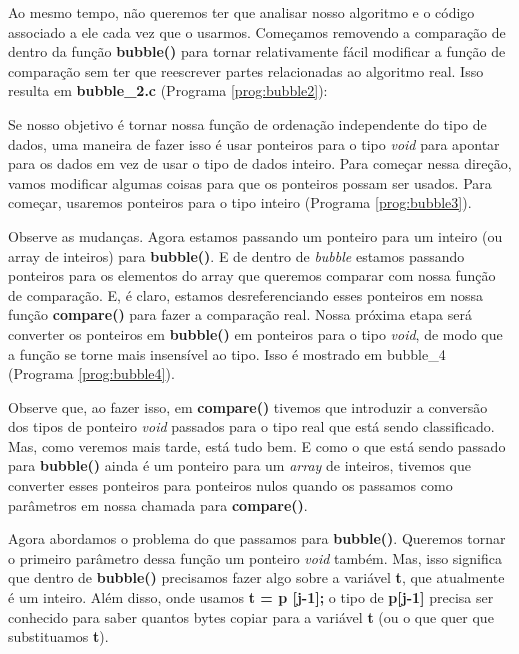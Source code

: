 Ao mesmo tempo, não queremos ter que analisar nosso algoritmo e o código associado a ele cada vez que o usarmos. Começamos removendo a comparação de dentro da função \textbf{bubble()} para tornar relativamente fácil modificar a função de comparação sem ter que reescrever partes relacionadas ao algoritmo real. Isso resulta em\textbf{ bubble\_2.c} (Programa \ref{prog:bubble2}):


Se nosso objetivo é tornar nossa função de ordenação independente do tipo de dados, uma maneira de fazer isso é usar ponteiros para o tipo \textit{void} para apontar para os dados em vez de usar o tipo de dados inteiro. Para começar nessa direção, vamos modificar algumas coisas para que os ponteiros possam ser usados. Para começar, usaremos ponteiros para o tipo inteiro (Programa \ref{prog:bubble3}).



Observe as mudanças. Agora estamos passando um ponteiro para um inteiro (ou array de inteiros) para \textbf{bubble()}. E de dentro de \textit{bubble} estamos passando ponteiros para os elementos do array que queremos comparar com nossa função de comparação. E, é claro, estamos desreferenciando esses ponteiros em nossa função \textbf{compare()} para fazer a comparação real. Nossa próxima etapa será converter os ponteiros em \textbf{bubble()} em ponteiros para o tipo \textit{void}, de modo que a função se torne mais insensível ao tipo. Isso é mostrado em bubble\_4 (Programa \ref{prog:bubble4}).



Observe que, ao fazer isso, em \textbf{compare()} tivemos que introduzir a conversão dos tipos de ponteiro \textit{void} passados para o tipo real que está sendo classificado. Mas, como veremos mais tarde, está tudo bem. E como o que está sendo passado para \textbf{bubble()} ainda é um ponteiro para um \textit{array} de inteiros, tivemos que converter esses ponteiros para ponteiros nulos quando os passamos como parâmetros em nossa chamada para \textbf{compare()}.

Agora abordamos o problema do que passamos para \textbf{bubble()}. Queremos tornar o primeiro parâmetro dessa função um ponteiro \textit{void} também. Mas, isso significa que dentro de \textbf{bubble()} precisamos fazer algo sobre a variável \textbf{t}, que atualmente é um inteiro. Além disso, onde usamos \textbf{t = p [j-1];} o tipo de \textbf{p[j-1]} precisa ser conhecido para saber quantos bytes copiar para a variável \textbf{t} (ou o que quer que substituamos \textbf{t}).

